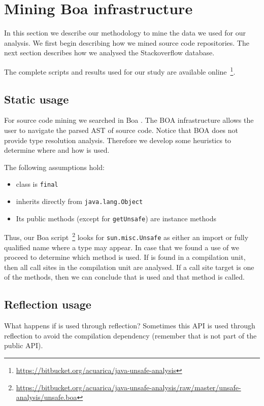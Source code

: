 
\section{Mining Boa infrastructure} \label{sec:methodologyboa}

In this section we describe our methodology to mine the data we used for our analysis.
We first begin describing how we mined source code repositories. The next section describes how we analysed the Stackoverflow database.

The complete scripts and results used for our study are available online~\footnote{\url{https://bitbucket.org/acuarica/java-unsafe-analysis}}.

\subsection{Static usage}

For source code mining we searched in Boa \cite{Dyer-Nguyen-Rajan-Nguyen-13}. 
The BOA infrastructure allows the user to navigate the parsed AST of source code.
Notice that BOA does not provide type resolution analysis.
Therefore we develop some heuristics to determine where and how \smu{} is used.

The following assumptions hold:
\begin{itemize}
\item \smu{} class is \texttt{final} 
\item inherits directly from \texttt{java.lang.Object}
\item Its public methods (except for \texttt{getUnsafe}) are instance methods
\end{itemize}

Thus, our Boa script~\footnote{\url{https://bitbucket.org/acuarica/java-unsafe-analysis/raw/master/unsafe-analysis/unsafe.boa}} looks for \texttt{sun.misc.Unsafe} as either an import or fully qualified name where a type may appear.
In case that we found a use of \smu{} we proceed to determine which method is used.
If \smu{} is found in a compilation unit, then all call sites in the compilation unit are analysed.
If a call site target is one of the \smu{} methods, then we can conclude that \smu{} is used and that method is called.

\subsection{Reflection usage}

What happens if \smu{} is used through reflection?
Sometimes this API is used through reflection to avoid the compilation dependency (remember that \smu{} is not part of the public API).

